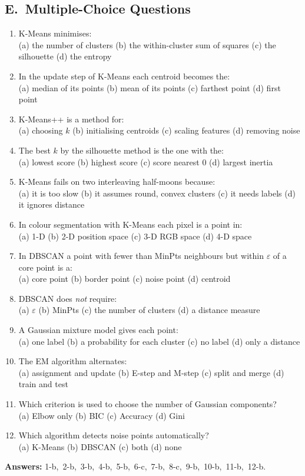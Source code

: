 \subsection*{E.\ Multiple-Choice Questions}
\begin{enumerate}
  \item K-Means minimises: \\
  (a) the number of clusters \quad (b) the within-cluster sum of squares \quad (c) the silhouette \quad (d) the entropy
  \item In the update step of K-Means each centroid becomes the: \\
  (a) median of its points \quad (b) mean of its points \quad (c) farthest point \quad (d) first point
  \item K-Means++ is a method for: \\
  (a) choosing $k$ \quad (b) initialising centroids \quad (c) scaling features \quad (d) removing noise
  \item The best $k$ by the silhouette method is the one with the: \\
  (a) lowest score \quad (b) highest score \quad (c) score nearest 0 \quad (d) largest inertia
  \item K-Means fails on two interleaving half-moons because: \\
  (a) it is too slow \quad (b) it assumes round, convex clusters \quad (c) it needs labels \quad (d) it ignores distance
  \item In colour segmentation with K-Means each pixel is a point in: \\
  (a) 1-D \quad (b) 2-D position space \quad (c) 3-D RGB space \quad (d) 4-D space
  \item In DBSCAN a point with fewer than MinPts neighbours but within $\varepsilon$ of a core point is a: \\
  (a) core point \quad (b) border point \quad (c) noise point \quad (d) centroid
  \item DBSCAN does \emph{not} require: \\
  (a) $\varepsilon$ \quad (b) MinPts \quad (c) the number of clusters \quad (d) a distance measure
  \item A Gaussian mixture model gives each point: \\
  (a) one label \quad (b) a probability for each cluster \quad (c) no label \quad (d) only a distance
  \item The EM algorithm alternates: \\
  (a) assignment and update \quad (b) E-step and M-step \quad (c) split and merge \quad (d) train and test
  \item Which criterion is used to choose the number of Gaussian components? \\
  (a) Elbow only \quad (b) BIC \quad (c) Accuracy \quad (d) Gini
  \item Which algorithm detects noise points automatically? \\
  (a) K-Means \quad (b) DBSCAN \quad (c) both \quad (d) none
\end{enumerate}
\textbf{Answers:} 1-b,\ 2-b,\ 3-b,\ 4-b,\ 5-b,\ 6-c,\ 7-b,\ 8-c,\ 9-b,\ 10-b,\ 11-b,\ 12-b.

